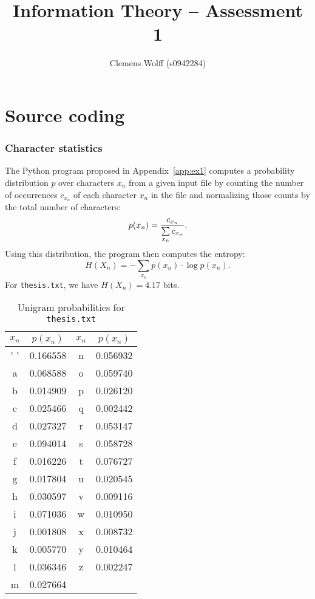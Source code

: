 \documentclass[10pt,a4paper,oneside,onecolumn]{article}
\title{Information Theory -- Assessment 1}
\author{Clemens Wolff (s0942284)}
\date{\vspace{-2em}}
\newcommand*{\thesisTXT}{{\tt thesis.txt}\xspace}
\begin{document}
\maketitle\thispagestyle{fancy}


\part{Source coding}


\section{Character statistics}\label{sec:ex1}

The Python program proposed in Appendix~\ref{app:ex1} computes a probability
distribution $p$ over characters $x_n$ from a given input file by counting the
number of occurrences $c_{x_n}$ of each character $x_n$ in the file and
normalizing those counts by the total number of characters:
\begin{equation}
    p(x_n) = {c_{x_n} \over\sum\limits_{x_n} c_{x_n}}.
\end{equation}
Using this distribution\footnotemark, the program then computes the entropy:
\begin{equation}
    H(X_n) = -\sum\limits_{x_n} p(x_n) \cdot \log p(x_n).
\end{equation}
For \thesisTXT, we have $H(X_n) = 4.17$ bits.\footnotemark
{}

\begin{table}[ht]
\centering
\begin{tabular}{| c c | c c |}
\hline
$x_n$ & $p(x_n)$ & $x_n$ & $p(x_n)$ \\
\hline
 ' '  & 0.166558 &   n   & 0.056932 \\
  a   & 0.068588 &   o   & 0.059740 \\
  b   & 0.014909 &   p   & 0.026120 \\
  c   & 0.025466 &   q   & 0.002442 \\
  d   & 0.027327 &   r   & 0.053147 \\
  e   & 0.094014 &   s   & 0.058728 \\
  f   & 0.016226 &   t   & 0.076727 \\
  g   & 0.017804 &   u   & 0.020545 \\
  h   & 0.030597 &   v   & 0.009116 \\
  i   & 0.071036 &   w   & 0.010950 \\
  j   & 0.001808 &   x   & 0.008732 \\
  k   & 0.005770 &   y   & 0.010464 \\
  l   & 0.036346 &   z   & 0.002247 \\
  m   & 0.027664 &       &          \\
\hline
\end{tabular}
\caption{Unigram probabilities for \thesisTXT}
\label{tbl:unigram-probs}
\end{table}
\end{document}
